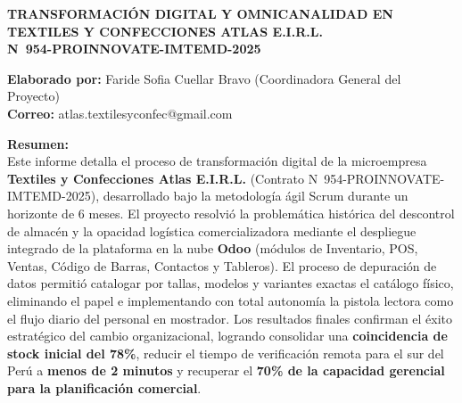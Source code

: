 \documentclass[12pt]{article}
\begin{document}
\vspace*{0.2cm}

\begin{center}
    {\large \textbf{TRANSFORMACIÓN DIGITAL Y OMNICANALIDAD EN TEXTILES Y CONFECCIONES ATLAS E.I.R.L.}}\\[0.4cm]
    {\large \textbf{N\textdegree\ 954-PROINNOVATE-IMTEMD-2025}}
\end{center}

\textbf{Elaborado por:} Faride Sofia Cuellar Bravo (Coordinadora General del Proyecto)\\
\textbf{Correo:} atlas.textilesyconfec@gmail.com

\textbf{Resumen:}\\
Este informe detalla el proceso de transformación digital de la microempresa \textbf{Textiles y Confecciones Atlas E.I.R.L.} (Contrato N\textdegree\ 954-PROINNOVATE-IMTEMD-2025), desarrollado bajo la metodología ágil Scrum durante un horizonte de 6 meses. El proyecto resolvió la problemática histórica del descontrol de almacén y la opacidad logística comercializadora mediante el despliegue integrado de la plataforma en la nube \textbf{Odoo} (módulos de Inventario, POS, Ventas, Código de Barras, Contactos y Tableros). El proceso de depuración de datos permitió catalogar por tallas, modelos y variantes exactas el catálogo físico, eliminando el papel e implementando con total autonomía la pistola lectora como el flujo diario del personal en mostrador. Los resultados finales confirman el éxito estratégico del cambio organizacional, logrando consolidar una \textbf{coincidencia de stock inicial del 78\%}, reducir el tiempo de verificación remota para el sur del Perú a \textbf{menos de 2 minutos} y recuperar el \textbf{70\% de la capacidad gerencial para la planificación comercial}.
\end{document}
